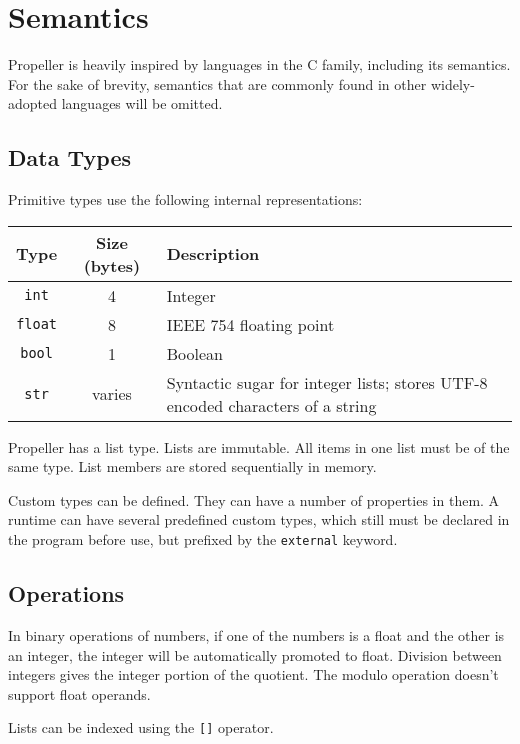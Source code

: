 \section{Semantics}

Propeller is heavily inspired by languages in the C family, including its semantics. For the sake of
brevity, semantics that are commonly found in other widely-adopted languages will be omitted.

\subsection{Data Types}

Primitive types use the following internal representations:
\begin{center}
\begin{tabular}{| c | c | p{8cm} | }
\hline
 \textbf{Type} & \textbf{Size (bytes)} & \textbf{Description} \\
 \hline
 \texttt{int} & 4 & Integer \\
 \hline
 \texttt{float} & 8 & IEEE 754 floating point \\
 \hline
 \texttt{bool} & 1 & Boolean \\
 \hline
 \texttt{str} & varies & Syntactic sugar for integer lists; stores UTF-8 encoded characters of a
 string \\
\hline
\end{tabular}
\end{center}

Propeller has a list type. Lists are immutable. All items in one list must be of the same type.
List members are stored sequentially in memory.

Custom types can be defined. They can have a number of properties in them. A runtime can have
several predefined custom types, which still must be declared in the program before use, but
prefixed by the \verb|external| keyword.

\subsection{Operations}

In binary operations of numbers, if one of the numbers is a float and the other is an integer, the
integer will be automatically promoted to float. Division between integers gives the integer portion
of the quotient. The modulo operation doesn't support float operands.

Lists can be indexed using the \verb|[]| operator.

